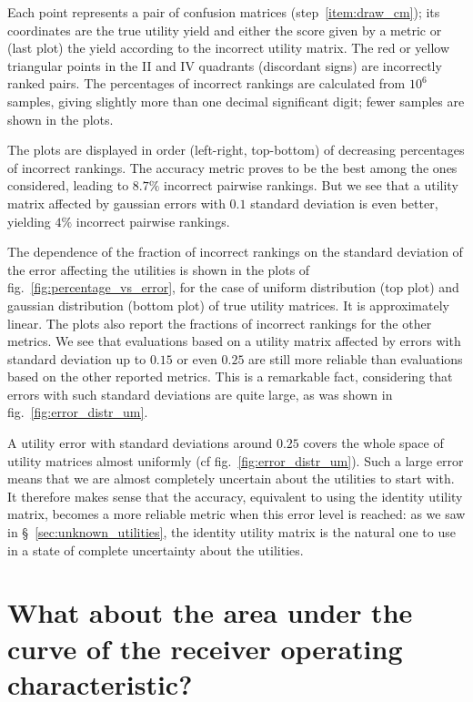 \documentclass[\ifafour a4paper,12pt,\else a5paper,10pt,\fi%
onecolumn,oneside,article,%
british%
]{memoir}
\theoremstyle{remark}
\theoremstyle{innote}
\renewcommand*{\|}[1][]{\nonscript\:#1\vert\nonscript\:\mathopen{}}
\newcommand*{\sect}{\S}%
\newcommand*{\fig}{fig.}%
\begin{document}
Each point represents a pair of confusion matrices (step~\ref{item:draw_cm}); its coordinates are the true utility yield and either the score given by a metric or (last plot) the yield according to the incorrect utility matrix. The red or yellow triangular points in the II and IV quadrants (discordant signs) are incorrectly ranked pairs. The percentages of incorrect rankings are calculated from $10^{6}$ samples, giving slightly more than one decimal significant digit; fewer samples are shown in the plots.

The plots are displayed in order (left-right, top-bottom) of decreasing percentages of incorrect rankings. The accuracy metric proves to be the best among the ones considered, leading to $8.7\%$ incorrect pairwise rankings. But we see that a utility matrix affected by gaussian errors with $0.1$ standard deviation is even better, yielding $4\%$ incorrect pairwise rankings.

The dependence of the fraction of incorrect rankings on the standard deviation of the error affecting the utilities is shown in the plots of \fig~\ref{fig:percentage_vs_error}, for the case of uniform distribution (top plot) and gaussian distribution (bottom plot) of true utility matrices. It is approximately linear. The plots also report the fractions of incorrect rankings for the other metrics. We see that evaluations based on a utility matrix affected by errors with standard deviation up to $0.15$ or even $0.25$ are still more reliable than evaluations based on the other reported metrics. This is a remarkable fact, considering that errors with such standard deviations are quite large, as was shown in \fig~\ref{fig:error_distr_um}.

A utility error with standard deviations around $0.25$ covers the whole space of utility matrices almost uniformly (cf \fig~\ref{fig:error_distr_um}). Such a large error means that we are almost completely uncertain about the utilities to start with. It therefore makes sense that the accuracy, equivalent to using the identity utility matrix, becomes a more reliable metric when this error level is reached: as we saw in \sect~\ref{sec:unknown_utilities}, the identity utility matrix is the natural one to use in a state of complete uncertainty about the utilities.


\section{What about the area under the curve of the receiver operating characteristic?}
\label{sec:auc}
\end{document}
